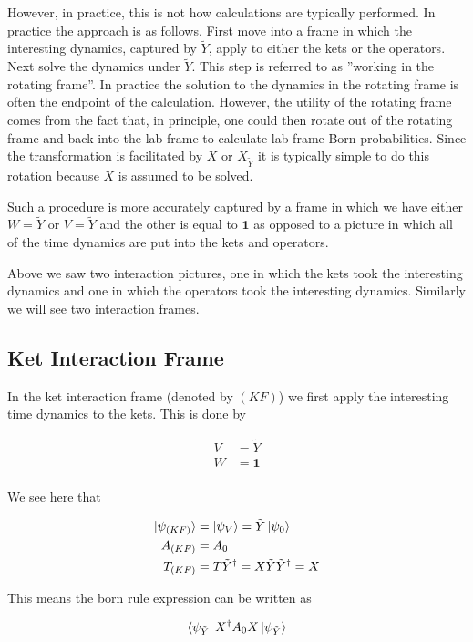\documentclass[12pt]{article}
\newcommand{\bv}[1]{\boldsymbol{#1}}
\begin{document}
However, in practice, this is not how calculations are typically performed. In practice the approach is as follows. First move into a frame in which the interesting dynamics, captured by $\tilde{Y}$, apply to either the kets or the operators. Next solve the dynamics under $\tilde{Y}$. This step is referred to as ''working in the rotating frame''. In practice the solution to the dynamics in the rotating frame is often the endpoint of the calculation. However, the utility of the rotating frame comes from the fact that, in principle, one could then rotate out of the rotating frame and back into the lab frame to calculate lab frame Born probabilities. Since the transformation is facilitated by $X$ or $X_{\tilde{Y}}$ it is typically simple to do this rotation because $X$ is assumed to be solved.

Such a procedure is more accurately captured by a frame in which we have either $W=\tilde{Y}$ or $V=\tilde{Y}$ and the other is equal to $\bv{1}$ as opposed to a picture in which all of the time dynamics are put into the kets and operators.

Above we saw two interaction pictures, one in which the kets took the interesting dynamics and one in which the operators took the interesting dynamics. Similarly we will see two interaction frames.

\subsection{Ket Interaction Frame}

In the ket interaction frame (denoted by $(KF)$) we first apply the interesting time dynamics to the kets. This is done by

\begin{align}
V &= \tilde{Y}\\
W &= \bv{1}\\
\end{align}

We see here that

\begin{align}
\ket{\psi_{(KF)}} &= \ket{\psi_V} = \tilde{Y} \ket{\psi_0}\\
A_{(KF)} &= A_0\\
T_{(KF)} &= T\tilde{Y}^{\dag} = X\tilde{Y}\tilde{Y}^{\dag} = X
\end{align}

This means the born rule expression can be written as

\begin{align}
\bra{\psi_{\tilde{Y}}} X^{\dag} A_0 X \ket{\psi_{\tilde{Y}}}
\end{align}
\end{document}
